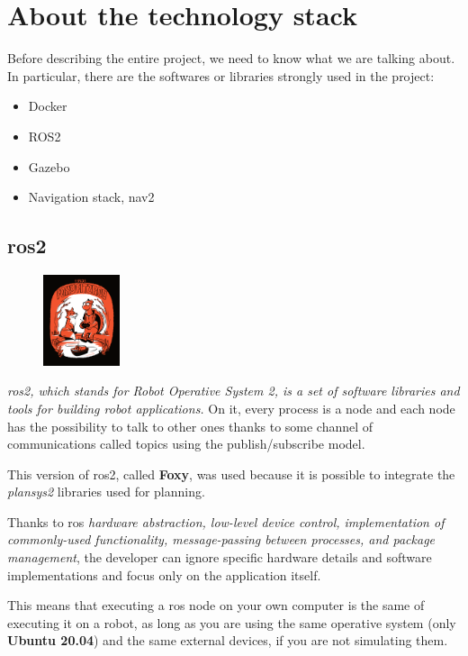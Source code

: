 \chapter{About the technology stack}
\label{cha:techstack}

Before describing the entire project, we need to know what we are talking about. In particular, there are the softwares or libraries strongly used in the project:  
\begin{itemize}
    \item Docker
    \item ROS2
    \item Gazebo
    \item Navigation stack, nav2
    \end{itemize}

\section{\acrshort{ros}2}

\begin{figure}
    \includegraphics[width=0.2\textwidth]{images/foxy}
\end{figure}

\textit{\acrshort{ros}2, which stands for Robot Operative System 2, is a set of software libraries and tools for building robot applications.}\cite{ros2desc} On it, every process is a node and each node has the possibility to talk to other ones thanks to some channel of communications called topics using the publish/subscribe model.

This version of \acrshort{ros}2, called \textbf{Foxy}, was used because it is possible to integrate the \textit{plansys2} libraries used for planning.

Thanks to \Acrshort{ros} \textit{hardware abstraction, low-level device control, implementation of commonly-used functionality, message-passing between processes, and package management}\cite{ros2help}, the developer can ignore specific hardware details and software implementations and focus only on the application itself. 

This means that executing a \acrshort{ros} node on your own computer is the same of executing it on a robot, as long as you are using the same operative system (only \textbf{Ubuntu 20.04}) and the same external devices, if you are not simulating them.

